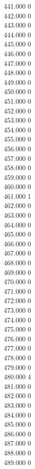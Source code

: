 { 441.000	0 \\
 442.000	0 \\
 443.000	0 \\
 444.000	0 \\
 445.000	0 \\
 446.000	0 \\
 447.000	0 \\
 448.000	0 \\
 449.000	0 \\
 450.000	0 \\
 451.000	0 \\
 452.000	0 \\
 453.000	0 \\
 454.000	0 \\
 455.000	0 \\
 456.000	0 \\
 457.000	0 \\
 458.000	0 \\
 459.000	0 \\
 460.000	0 \\
 461.000	1 \\
 462.000	0 \\
 463.000	0 \\
 464.000	0 \\
 465.000	0 \\
 466.000	0 \\
 467.000	0 \\
 468.000	0 \\
 469.000	0 \\
 470.000	0 \\
 471.000	0 \\
 472.000	0 \\
 473.000	0 \\
 474.000	0 \\
 475.000	0 \\
 476.000	0 \\
 477.000	0 \\
 478.000	0 \\
 479.000	0 \\
 480.000	4 \\
 481.000	0 \\
 482.000	0 \\
 483.000	0 \\
 484.000	0 \\
 485.000	0 \\
 486.000	0 \\
 487.000	0 \\
 488.000	0 \\
 489.000	0 \\
}
